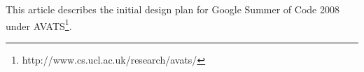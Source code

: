 
\vspace{.5cm} 

\begin{center} 

This article describes the initial design plan for \textsf{Google Summer of Code
2008} under
\textsf{AVATS}\footnote{\textsf{http://www.cs.ucl.ac.uk/research/avats/}}.

\end{center}
